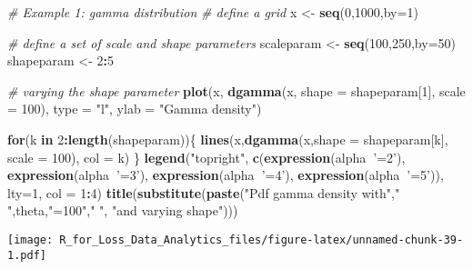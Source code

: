 \documentclass[]{book}
\newenvironment{Shaded}{\begin{snugshade}}{\end{snugshade}}
\newcommand{\KeywordTok}[1]{\textcolor[rgb]{0.13,0.29,0.53}{\textbf{#1}}}
\newcommand{\DataTypeTok}[1]{\textcolor[rgb]{0.13,0.29,0.53}{#1}}
\newcommand{\DecValTok}[1]{\textcolor[rgb]{0.00,0.00,0.81}{#1}}
\newcommand{\StringTok}[1]{\textcolor[rgb]{0.31,0.60,0.02}{#1}}
\newcommand{\CommentTok}[1]{\textcolor[rgb]{0.56,0.35,0.01}{\textit{#1}}}
\newcommand{\ControlFlowTok}[1]{\textcolor[rgb]{0.13,0.29,0.53}{\textbf{#1}}}
\newcommand{\OperatorTok}[1]{\textcolor[rgb]{0.81,0.36,0.00}{\textbf{#1}}}
\newcommand{\NormalTok}[1]{#1}
\theoremstyle{definition}
\theoremstyle{definition}
\theoremstyle{definition}
\theoremstyle{remark}
\begin{document}
\begin{Shaded}
\begin{Highlighting}[]
\CommentTok{# Example 1: gamma distribution}
\CommentTok{# define a grid}
\NormalTok{x <-}\StringTok{ }\KeywordTok{seq}\NormalTok{(}\DecValTok{0}\NormalTok{,}\DecValTok{1000}\NormalTok{,}\DataTypeTok{by=}\DecValTok{1}\NormalTok{)}

\CommentTok{# define a set of scale and shape parameters}
\NormalTok{scaleparam <-}\StringTok{ }\KeywordTok{seq}\NormalTok{(}\DecValTok{100}\NormalTok{,}\DecValTok{250}\NormalTok{,}\DataTypeTok{by=}\DecValTok{50}\NormalTok{)}
\NormalTok{shapeparam <-}\StringTok{ }\DecValTok{2}\OperatorTok{:}\DecValTok{5}

\CommentTok{# varying the shape parameter}
\KeywordTok{plot}\NormalTok{(x, }\KeywordTok{dgamma}\NormalTok{(x, }\DataTypeTok{shape =}\NormalTok{ shapeparam[}\DecValTok{1}\NormalTok{], }\DataTypeTok{scale =} \DecValTok{100}\NormalTok{), }\DataTypeTok{type =} \StringTok{"l"}\NormalTok{, }\DataTypeTok{ylab =} \StringTok{"Gamma density"}\NormalTok{)}

\ControlFlowTok{for}\NormalTok{(k }\ControlFlowTok{in} \DecValTok{2}\OperatorTok{:}\KeywordTok{length}\NormalTok{(shapeparam))\{}
  \KeywordTok{lines}\NormalTok{(x,}\KeywordTok{dgamma}\NormalTok{(x,}\DataTypeTok{shape =}\NormalTok{ shapeparam[k], }\DataTypeTok{scale =} \DecValTok{100}\NormalTok{), }\DataTypeTok{col =}\NormalTok{ k)}
\NormalTok{\}}
\KeywordTok{legend}\NormalTok{(}\StringTok{"topright"}\NormalTok{, }\KeywordTok{c}\NormalTok{(}\KeywordTok{expression}\NormalTok{(alpha}\OperatorTok{~}\StringTok{'=2'}\NormalTok{), }\KeywordTok{expression}\NormalTok{(alpha}\OperatorTok{~}\StringTok{'=3'}\NormalTok{), }\KeywordTok{expression}\NormalTok{(alpha}\OperatorTok{~}\StringTok{'=4'}\NormalTok{), }\KeywordTok{expression}\NormalTok{(alpha}\OperatorTok{~}\StringTok{'=5'}\NormalTok{)), }\DataTypeTok{lty=}\DecValTok{1}\NormalTok{, }\DataTypeTok{col =} \DecValTok{1}\OperatorTok{:}\DecValTok{4}\NormalTok{)}
\KeywordTok{title}\NormalTok{(}\KeywordTok{substitute}\NormalTok{(}\KeywordTok{paste}\NormalTok{(}\StringTok{"Pdf gamma density with"}\NormalTok{,}\StringTok{" "}\NormalTok{,theta,}\StringTok{"=100"}\NormalTok{,}\StringTok{" "}\NormalTok{, }\StringTok{"and varying shape"}\NormalTok{)))}
\end{Highlighting}
\end{Shaded}

\texttt{[image: R\_for\_Loss\_Data\_Analytics\_files/figure-latex/unnamed-chunk-39-1.pdf]}
\end{document}
